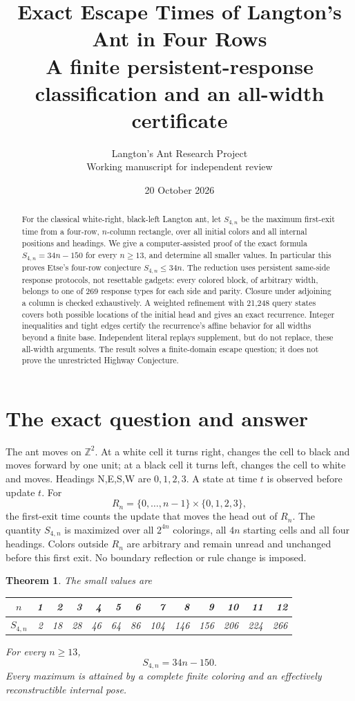 \documentclass[11pt]{article}
\title{Exact Escape Times of Langton's Ant in Four Rows\\[4pt]
\large A finite persistent-response classification and an all-width certificate}
\author{Langton's Ant Research Project\\\small Working manuscript for independent review}
\date{20 October 2026}
\newtheorem{theorem}{Theorem}
\theoremstyle{definition}\newtheorem{definition}[theorem]{Definition}
\newcommand{\ZZ}{\mathbb Z}
\begin{document}
\maketitle
\begin{abstract}
For the classical white-right, black-left Langton ant, let $S_{4,n}$ be the
maximum first-exit time from a four-row, $n$-column rectangle, over all initial
colors and all internal positions and headings. We give a computer-assisted
proof of the exact formula $S_{4,n}=34n-150$ for every $n\ge13$, and determine all
smaller values. In particular this proves Etse's four-row conjecture
$S_{4,n}\le34n$. The reduction uses persistent same-side response protocols,
not resettable gadgets: every colored block, of arbitrary width, belongs to
one of 269 response types for each side and parity. Closure under adjoining a
column is checked exhaustively. A weighted refinement with 21,248 query states
covers both possible locations of the initial head and gives an exact recurrence.
Integer inequalities and tight edges certify the recurrence's affine behavior
for all widths beyond a finite base. Independent literal replays supplement,
but do not replace, these all-width arguments. The result solves a finite-domain
escape question; it does not prove the unrestricted Highway Conjecture.
\end{abstract}

\section{The exact question and answer}
The ant moves on $\ZZ^2$. At a white cell it turns right, changes the cell to
black and moves forward by one unit; at a black cell it turns left, changes the
cell to white and moves. Headings N,E,S,W are $0,1,2,3$. A state at time $t$ is
observed before update $t$. For
\[
 R_n=\{0,\ldots,n-1\}\times\{0,1,2,3\},
\]
the first-exit time counts the update that moves the head out of $R_n$.
The quantity $S_{4,n}$ is maximized over all $2^{4n}$ colorings, all $4n$ starting
cells and all four headings. Colors outside $R_n$ are arbitrary and remain
unread and unchanged before this first exit. No boundary reflection or rule
change is imposed.

\begin{theorem}\label{thm:main}
The small values are
\begin{center}\small
\begin{tabular}{c|rrrrrrrrrrrr}
$n$&1&2&3&4&5&6&7&8&9&10&11&12\\\hline
$S_{4,n}$&2&18&28&46&64&86&104&146&156&206&224&266
\end{tabular}\end{center}
For every $n\ge13$,
\begin{equation}\label{eq:main} S_{4,n}=34n-150.\end{equation}
Every maximum is attained by a complete finite coloring and an effectively
reconstructible internal pose.
\end{theorem}
\end{document}
